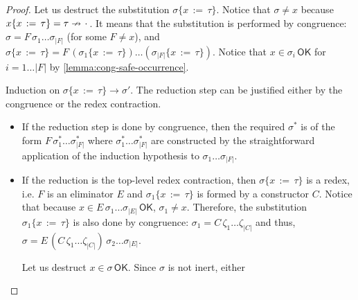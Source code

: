 \documentclass[a4,natbib=false]{article}
\newcommand{\ilyam}[1]{{\color{red} \texttt{Ilya:  #1}}}
\newcommand{\subst}[3]{{#1}\{{#2}\,:=\,{#3}\}}
\newcommand{\spcdot}{\mkern 2mu\cdot\mkern 2mu}
\newcommand{\reduces}[2]{{#1} \rightarrow {#2}}
\newcommand{\narg}[1]{|{#1}|}
\newcommand{\judgeSok}[2]{{#1} \in {#2}\,\mathsf{OK}}
\newcommand{\fv}[1]{\mathsf{FV}(#1)}
\newcommand{\fullterm}[2]{{#1}\,#2_1 \dots #2_{\narg{#1}}}
\begin{document}
\begin{proof}
  Let us destruct the substitution $\subst{\sigma}{x}{\tau}$. Notice that
  $\sigma \neq x$ because $\subst{x}{x}{\tau} = \tau \nrightarrow \spcdot$. It
  means that the substitution is performed by congruence: $\sigma =
  \fullterm{F}{\sigma}$ (for some $F \neq x$), and $\subst{\sigma}{x}{\tau} =
  F\, (\subst{\sigma_1}{x}{\tau}) \dots (\subst{\sigma_{\narg{F}}}{x}{\tau}) $.
  Notice that $\judgeSok{x}{\sigma_i}$ for $i = 1 \dots \narg F$ by
  \cref{lemma:cong-safe-occurrence}.

  Induction on $\reduces{\subst{\sigma}{x}{\tau}}{\sigma'}$.
  The reduction step can be justified either by the congruence or the redex contraction.
  \begin{itemize}
  \item If the reduction step is done by congruence, then the required
    $\sigma^*$ is of the form $\fullterm{F}{\sigma^*}$ where $\sigma^*_1 \dots
    \sigma^*_{\narg{F}}$ are constructed by the straightforward application of
    the induction hypothesis to $\sigma_1 \dots \sigma_{\narg{F}}$.

  \item If the reduction is the top-level redex contraction, then
    $\subst{\sigma}{x}{\tau}$ is a redex, i.e. $F$ is an eliminator $E$ and
    $\subst{\sigma_1}{x}{\tau}$ is formed by a constructor $C$.
    Notice that because
    $\judgeSok{x}{\fullterm{E}{\sigma}}$, $\sigma_1
    \neq x$. Therefore, the substitution $\subst{\sigma_1}{x}{\tau}$ is also done by
    congruence: $\sigma_1 = \fullterm{C}{\zeta}$ and thus,
    $\sigma = E \, (\fullterm{C}{\zeta}) \, \sigma_2 \dots \sigma_{\narg{E}}$.

    Let us destruct $\judgeSok{x}{\sigma}$. Since $\sigma$ is not inert, either
  \end{itemize}
\end{proof}
\end{document}
